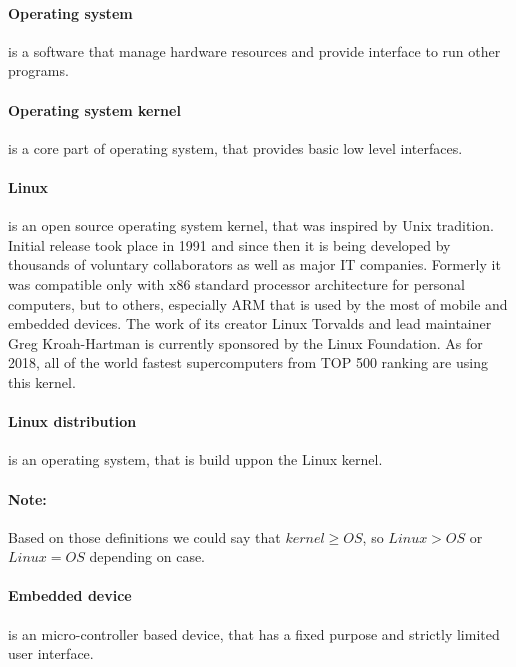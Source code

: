 \documentclass[printmode]{mgr}
\begin{document}
\paragraph{Operating system} is a software that manage hardware resources and provide interface to run other programs.

\paragraph{Operating system kernel} is a core part of operating system, that provides  basic low level interfaces.\\

\paragraph{Linux} is an open source operating system kernel, that was inspired by Unix tradition. Initial release took place in 1991 and since then it is being developed by thousands of voluntary collaborators as well as major IT companies. Formerly it was compatible only with x86 standard processor architecture for personal computers, but to others, especially ARM that is used by the most of mobile and embedded devices. The work of its creator Linux Torvalds and lead maintainer Greg Kroah-Hartman is currently sponsored by the Linux Foundation. As for 2018, all of the world fastest supercomputers from TOP 500 ranking are using this kernel.

\paragraph{Linux distribution} is an operating system, that is build uppon the Linux kernel.

\paragraph{Note:} Based on those definitions we could say that $kernel \ge OS$, so $Linux > OS$ or $Linux = OS$ depending on case.

\paragraph{Embedded device} is an micro-controller based device, that has a fixed purpose and strictly limited user interface.
\end{document}
